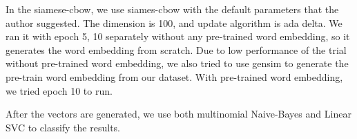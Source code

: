 In the siamese-cbow, we use siames-cbow with the default parameters that the author suggested. 
The dimension is 100, and update algorithm is ada delta. 
We ran it with epoch 5, 10 separately without any pre-trained word embedding, so it generates the word embedding from scratch.
Due to low performance of the trial without pre-trained word embedding, we also tried to use gensim to generate the pre-train word embedding from our dataset.
With pre-trained word embedding, we tried epoch 10 to run.

After the vectors are generated, we use both multinomial Naive-Bayes and Linear SVC to classify the results.